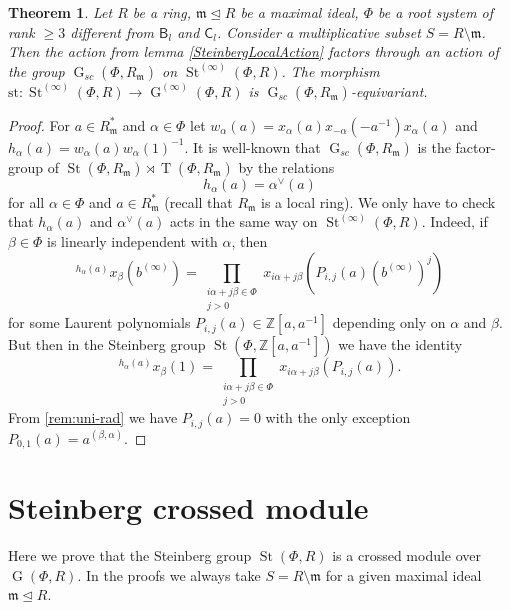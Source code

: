 \documentclass{article}
\numberwithin{equation}{section}
\newtheorem{theorem}{Theorem}
\theoremstyle{definition}
\theoremstyle{remark}
\DeclareMathOperator\St{St}
\DeclareMathOperator\GG{G}
\DeclareMathOperator\Torus{T}
\newcommand{\up}[2]{{^{#1}\!{#2}}}
\newcommand{\rB}{\mathsf{B}}
\newcommand{\rC}{\mathsf{C}}
\begin{document}
\begin{theorem}\label{ChevalleyLocalAction}
 Let \(R\) be a ring, \(\mathfrak m \trianglelefteq R\) be a maximal ideal, \(\Phi\) be a root system of rank \(\geq 3\) different from \(\rB_l\) and \(\rC_l\). Consider a multiplicative subset \(S = R \setminus \mathfrak m\). Then the action from lemma \ref{SteinbergLocalAction} factors through an action of the group \(\GG_{sc}(\Phi, R_{\mathfrak m})\) on \(\St^{(\infty)}(\Phi, R)\). The morphism \(\mathrm{st} \colon \St^{(\infty)}(\Phi, R) \to \GG^{(\infty)}(\Phi, R)\) is \(\GG_{sc}(\Phi, R_{\mathfrak m})\)-equivariant.
\end{theorem}
\begin{proof}
 For \(a \in R_{\mathfrak m}^*\) and \(\alpha \in \Phi\) let \(w_\alpha(a) = x_\alpha(a) x_{-\alpha}(-a^{-1}) x_\alpha(a)\) and \(h_\alpha(a) = w_\alpha(a) w_\alpha(1)^{-1}\). It is well-known that \(\GG_{sc}(\Phi, R_{\mathfrak m})\) is the factor-group of \(\St(\Phi, R_{\mathfrak m}) \rtimes \Torus(\Phi, R_{\mathfrak m})\) by the relations
 \[h_\alpha(a) = \alpha^\vee(a)\]
 for all \(\alpha \in \Phi\) and \(a \in R_{\mathfrak m}^*\) (recall that \(R_{\mathfrak m}\) is a local ring). We only have to check that \(h_\alpha(a)\) and \(\alpha^\vee(a)\) acts in the same way on \(\St^{(\infty)}(\Phi, R)\). Indeed, if \(\beta \in \Phi\) is linearly independent with \(\alpha\), then
 \[\up{h_\alpha(a)}{x_\beta(b^{(\infty)})} = \prod_{\substack{i\alpha + j\beta \in \Phi\\ j > 0}} x_{i\alpha + j\beta}(P_{i, j}(a) (b^{(\infty)})^j)\]
 for some Laurent polynomials \(P_{i, j}(a) \in \mathbb Z[a, a^{-1}]\) depending only on \(\alpha\) and \(\beta\). But then in the Steinberg group \(\St(\Phi, \mathbb Z[a, a^{-1}])\) we have the identity
 \[\up{h_\alpha(a)}{x_\beta(1)} = \prod_{\substack{i\alpha + j\beta \in \Phi\\ j > 0}} x_{i\alpha + j\beta}(P_{i, j}(a)).\]
 From \cref{rem:uni-rad} we have \(P_{i, j}(a) = 0\) with the only exception \(P_{0, 1}(a) = a^{(\beta, \alpha)}\).
\end{proof}

\section{Steinberg crossed module}

Here we prove that the Steinberg group \(\St(\Phi, R)\) is a crossed module over \(\GG(\Phi, R)\). In the proofs we always take \(S = R \setminus \mathfrak m\) for a given maximal ideal \(\mathfrak m \trianglelefteq R\).
\end{document}

